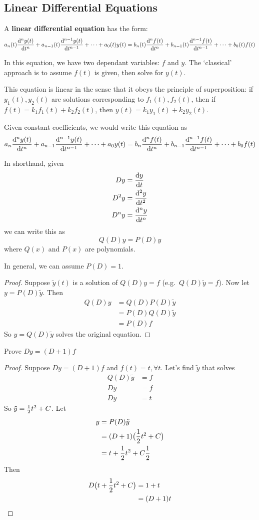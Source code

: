 \documentclass[12pt]{article}
\begin{document}
\subsection{Linear Differential Equations}
A {\bf linear differential equation} has the form: \[ a_n(t)\frac{{\rm d}^{n} y(t)}{{\rm d} t^{n}} + a_{n-1}(t)\frac{{\rm d}^{n-1} y(t)}{{\rm d} t^{n-1}} + \cdots + a_0(t) y(t) = b_n(t)\frac{{\rm d}^{n} f(t)}{{\rm d} t^{n}} + b_{n-1}(t)\frac{{\rm d}^{n-1} f(t)}{{\rm d} t^{n-1}} + \cdots + b_0(t) f(t) \]

In this equation, we have two dependant variables: $f$ and $y$. The `classical' approach is to assume $f(t)$ is given, then solve for $y(t)$.

This equation is linear in the sense that it obeys the principle of superposition: if $y_1(t), y_2(t)$ are solutions corresponding to $f_1(t), f_2(t)$, then if $f(t) = k_1f_1(t) + k_2f_2(t)$, then $y(t) = k_1y_1(t) + k_2y_2(t)$.

Given constant coefficients, we would write this equation as \[ a_n\frac{{\rm d}^{n} y(t)}{{\rm d} t^{n}} + a_{n-1}\frac{{\rm d}^{n-1} y(t)}{{\rm d} t^{n-1}} + \cdots + a_0y(t) = b_n\frac{{\rm d}^{n} f(t)}{{\rm d} t^{n}} + b_{n-1}\frac{{\rm d}^{n-1} f(t)}{{\rm d} t^{n-1}} + \cdots + b_0f(t) \]

In shorthand, given
\begin{align*}
Dy &= \frac{{\rm d} y}{{\rm d} t}\\
D^2 y &= \frac{{\rm d}^2 y}{{\rm d} t^2}\\
D^n y &= \frac{{\rm d}^{n} y}{{\rm d} t^{n}}
\end{align*}
we can write this as \[ Q(D)y = P(D)y \] where $Q(x)$ and $P(x)$ are polynomials.

In general, we can assume $P(D) = 1$.

\begin{proof}
Suppose $\tilde y(t)$ is a solution of $Q(D)y = f$ (e.g.\ $Q(D) \tilde y = f$). Now let $y = P(D) \tilde y$. Then
\begin{align*}
Q(D)y &= Q(D)P(D) \tilde y\\
&= P(D)Q(D)\tilde y\\
&= P(D) f
\end{align*}
So $y = Q(D)\tilde y$ solves the original equation.
\end{proof}

\begin{example}
Prove $Dy = (D+1)f$
\end{example}

\begin{proof}
Suppose $Dy = (D + 1)f$ and $f(t) = t, \forall t$. Let's find $\tilde y$ that solves
\begin{align*}
Q(D)\tilde y &= f\\
D\tilde y &= f\\
D\tilde y &= t
\end{align*}
So $\tilde y = \frac{1}{2} t^2 + C$. Let
\begin{align*}
y &= P(D)\tilde y\\
&= (D+1)\bigl(\frac{1}{2} t^2 + C\bigl)\\
&= t + \frac{1}{2} t^2 + C \frac{1}{2}
\end{align*}
Then
\begin{align*}
D\bigl(t + \frac{1}{2} t^2 + C\bigl) &= 1 + t\\
&= (D + 1)t
\end{align*}
\end{proof}
\end{document}
